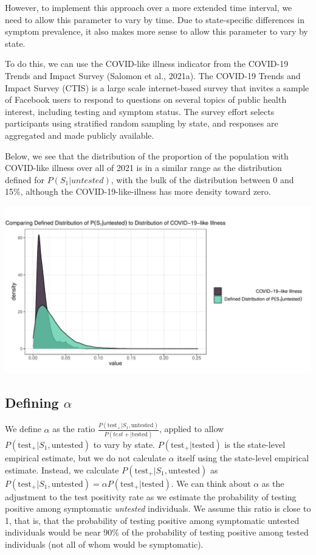 \documentclass[12pt,twoside]{smiththesis}
\begin{document}
However, to implement this approach over a more extended time interval, we need to allow this parameter to vary by time. Due to state-specific differences in symptom prevalence, it also makes more sense to allow this parameter to vary by state.

To do this, we can use the COVID-like illness indicator from the COVID-19 Trends and Impact Survey (Salomon et al., 2021a). The COVID-19 Trends and Impact Survey (CTIS) is a large scale internet-based survey that invites a sample of Facebook users to respond to questions on several topics of public health interest, including testing and symptom status. The survey effort selects participants using stratified random sampling by state, and responses are aggregated and made publicly available.

Below, we see that the distribution of the proportion of the population with COVID-like illness over all of 2021 is in a similar range as the distribution defined for \(P(S_1|untested)\), with the bulk of the distribution between 0 and 15\%, although the COVID-19-like-illness has more density toward zero.
\begin{center}\includegraphics[width=0.8\linewidth]{figure/emp_p_s_untested} \end{center}

\hypertarget{defining-alpha}{%
\subsection{\texorpdfstring{Defining \(\alpha\)}{Defining \textbackslash alpha}}\label{defining-alpha}}

We define \(\alpha\) as the ratio \(\frac{P(\text{test}_+|S_1, \text{untested})}{P(test+|\text{tested})}\), applied to allow
\(P(\text{test}_+|S_1, \text{untested})\) to vary by state. \(P(\text{test}_+|\text{tested})\) is the state-level empirical estimate, but we do not calculate \(\alpha\) itself using the state-level empirical estimate. Instead, we calculate \(P(\text{test}_+|S_1, \text{untested})\) as \(P(\text{test}_+|S_1, \text{untested}) =\alpha P(\text{test}_+|\text{tested})\). We can think about \(\alpha\) as the adjustment to the test positivity rate as we estimate the probability of testing positive among symptomatic \emph{untested} individuals. We assume this ratio is close to 1, that is, that the probability of testing positive among symptomatic untested individuals would be near 90\% of the probability of testing positive among tested individuals (not all of whom would be symptomatic).
\end{document}
